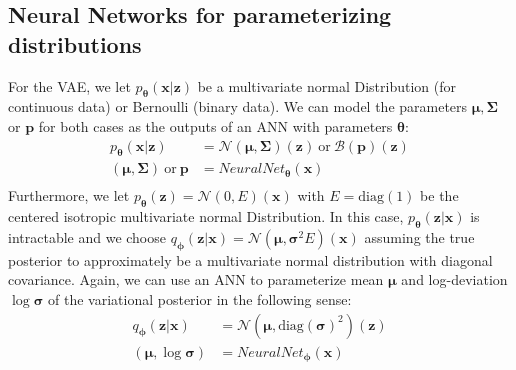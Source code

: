 \documentclass[12pt]{report}
\theoremstyle{definition}
\begin{document}
\subsection{Neural Networks for parameterizing distributions}
For the VAE, we let $p_{\pmb{\theta}}(\mathbf{x}|\mathbf{z})$ be a multivariate normal Distribution (for continuous data) or Bernoulli (binary data). We can model the parameters $\pmb{\mu}, \pmb{\Sigma}$ or $\mathbf{p}$ for both cases as the outputs of an ANN with parameters $\pmb{\theta}$:
\begin{equation}
\begin{split}
p_{\pmb{\theta}}(\mathbf{x}|\mathbf{z}) & = \mathcal{N}(\pmb{\mu}, \pmb{\Sigma})(\mathbf{z}) \ \mathrm{or} \ \mathcal{B}(\mathbf{p})(\mathbf{z}) \\
(\pmb{\mu}, \pmb{\Sigma}) \ \mathrm{or} \ \mathbf{p} & = NeuralNet_{\pmb{\theta}}(\mathbf{x}) \\
\end{split}
\end{equation}
Furthermore, we let $p_{\pmb{\theta}}(\mathbf{z})=\mathcal{N}(0, E)(\mathbf{x})$ with $E=\mathrm{diag}(1)$ be the centered isotropic multivariate normal Distribution. In this case,  $p_{\pmb{\theta}}(\mathbf{z}|\mathbf{x})$ is intractable and we choose $q_{\pmb{\phi}}(\mathbf{z}|\mathbf{x})=\mathcal{N}(\pmb{\mu}, \pmb{\sigma}^2 E)(\mathbf{x})$ assuming the true posterior to approximately be a multivariate normal distribution with diagonal covariance. Again, we can use an ANN to parameterize mean $\pmb{\mu}$ and log-deviation $\log \pmb{\sigma}$ of the variational posterior in the following sense:
\begin{equation}
\begin{split}
q_{\pmb{\phi}}(\mathbf{z}|\mathbf{x}) & = \mathcal{N}(\pmb{\mu}, \mathrm{diag}(\pmb{\sigma})^2)(\mathbf{z}) \\
(\pmb{\mu}, \log \pmb{\sigma}) & = NeuralNet_{\pmb{\phi}}(\mathbf{x}) \\
\end{split}
\end{equation}
\end{document}
